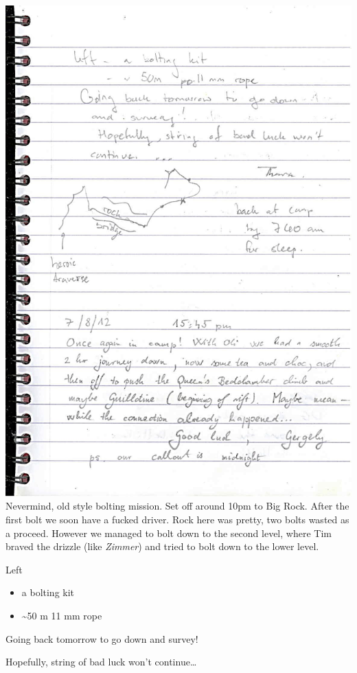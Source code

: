 \includegraphics{UgLog1012/87.jpeg}Nevermind, old style bolting mission.
Set off around 10pm to Big Rock. After the first bolt we soon have a
fucked driver. Rock here was pretty, two bolts wasted as a proceed.
However we managed to bolt down to the second level, where Tim braved
the drizzle (like \emph{Zimmer}) and tried to bolt down to the lower
level.

Left

\begin{itemize}
\tightlist
\item
  a bolting kit
\item
  \textasciitilde 50 m 11 mm rope
\end{itemize}

Going back tomorrow to go down and survey!

Hopefully, string of bad luck won't continue\ldots{}


